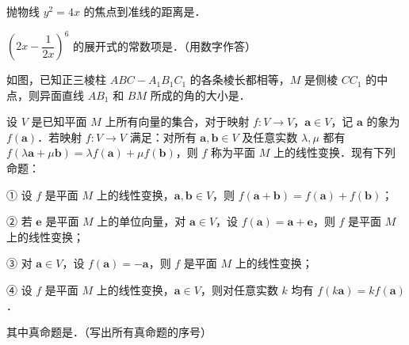 \begin{question}
抛物线 $y^2=4x$ 的焦点到准线的距离是\gkblank{}．

\end{question}
\begin{question}
$\left(2x-\dfrac1{2x}\right)^6$ 的展开式的常数项是\gkblank{}．（用数字作答）

\Needspace{0.4\textheight}
\end{question}
\begin{question}
如图，已知正三棱柱 $ABC-A_1B_1C_1$ 的各条棱长都相等，$M$ 是侧棱 $CC_1$ 的中点，则异面直线 $AB_1$ 和 $BM$ 所成的角的大小是\gkblank{}．
\nopagebreak[4]
\begin{center}\end{center}
\nopagebreak[4]
\end{question}
\begin{question}
设 $V$ 是已知平面 $M$ 上所有向量的集合，对于映射 $f:V\to V$，$\boldsymbol a\in V$，记 $\boldsymbol a$ 的象为 $f(\boldsymbol a)$．若映射 $f:V\to V$ 满足：对所有 $\boldsymbol a,\boldsymbol b\in V$ 及任意实数 $\lambda,\mu$ 都有 $f(\lambda\boldsymbol a+\mu\boldsymbol b)=\lambda f(\boldsymbol a)+\mu f(\boldsymbol b)$，则 $f$ 称为平面 $M$ 上的线性变换．现有下列命题：

① 设 $f$ 是平面 $M$ 上的线性变换，$\boldsymbol a,\boldsymbol b\in V$，则 $f(\boldsymbol a+\boldsymbol b)=f(\boldsymbol a)+f(\boldsymbol b)$；

② 若 $\boldsymbol e$ 是平面 $M$ 上的单位向量，对 $\boldsymbol a\in V$，设 $f(\boldsymbol a)=\boldsymbol a+\boldsymbol e$，则 $f$ 是平面 $M$ 上的线性变换；

③ 对 $\boldsymbol a\in V$，设 $f(\boldsymbol a)=-\boldsymbol a$，则 $f$ 是平面 $M$ 上的线性变换；

④ 设 $f$ 是平面 $M$ 上的线性变换，$\boldsymbol a\in V$，则对任意实数 $k$ 均有 $f(k\boldsymbol a)=kf(\boldsymbol a)$．

其中真命题是\gkblank{}．（写出所有真命题的序号）

\end{question}

